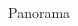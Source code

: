 \begin{minipage}{\linewidth}
\begin{multicols}{4}








\vfill\null
\columnbreak

Panorama\\


\end{multicols}
\end{minipage}
